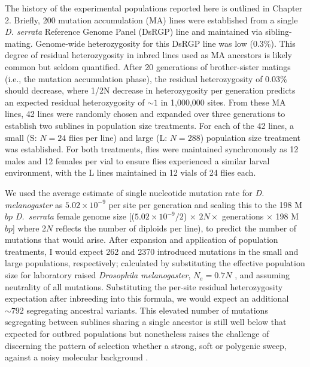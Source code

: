 The history of the experimental populations reported here is outlined in Chapter 2. Briefly, 200 mutation accumulation (MA) lines were established from a single \textit{D. serrata} Reference Genome Panel (DsRGP) line \citep{Redd18} and maintained via sibling-mating. Genome-wide heterozygosity for this DsRGP line was low (0.3\%). This degree of residual heterozygosity in inbred lines used as MA ancestors is likely common but seldom quantified. After 20 generations of brother-sister matings (i.e., the mutation accumulation phase), the residual heterozygosity of 0.03\% should decrease, where 1/2N decrease in heterozygosity per generation \citep{Fran02} predicts an expected residual heterozygosity of $\sim 1$ in 1,000,000 sites. From these MA lines, 42 lines were randomly chosen and expanded over three generations to establish two sublines in population size treatments. For each of the 42 lines, a small (S: $N = 24$ flies per line) and large (L: $N = 288$) population size treatment was established. For both treatments, flies were maintained synchronously as 12 males and 12 females per vial to ensure flies experienced a similar larval environment, with the L lines maintained in 12 vials of 24 flies each. \par

We used the average estimate of single nucleotide mutation rate for \textit{D. melanogaster} as $5.02\times10^{-9}$ per site per generation \citep{Katj19} and scaling this to the 198 M$bp$ \textit{D.~serrata} female genome size \citep{Alle17B}[($5.02\times10^{-9}/2$) $\times$ $2N \times$ generations $\times$ 198 M$bp$] where 2$N$ reflects the number of diploids per line), to predict the number of mutations that would arise. After expansion and application of population treatments, I would expect 262 and 2370 introduced mutations in the small and large populations, respectively; calculated by substituting the effective population size for laboratory raised \textit{Drosophila melanogaster}, $N_e = 0.7N$ \citep{Crow55}, and assuming neutrality of all mutations. Substituting the per-site residual heterozygosity expectation after inbreeding into this formula, we would expect an additional $\sim792$ segregating ancestral variants.  This elevated number of mutations segregating between sublines sharing a single ancestor is still well below that expected for outbred populations but nonetheless raises the challenge of discerning the pattern of selection whether a strong, soft or polygenic sweep, against a noisy molecular background \citep{Wals18c9}.\par


